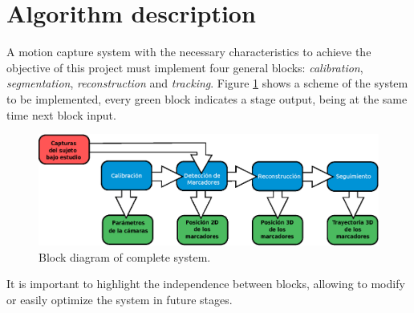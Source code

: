 \section{Algorithm description}\label{implementacion}
A motion capture system with the necessary characteristics to achieve the objective of this project must implement four general blocks: 
\emph{calibration}, \emph{segmentation}, \emph{reconstruction} and \emph{tracking}. Figure \ref{bloquesSist} shows a scheme of the system to be implemented, every green block indicates a stage output, being at the same time next block input.
\begin{figure}[ht!]
\centering
\hspace{-0.5cm}
\includegraphics[scale=0.4]{imagenes/Sistema_completo/Diagrama_de_bloques.eps}
\caption{Block diagram of complete system.}
\label{bloquesSist}
\end{figure}

It is important to highlight the independence between blocks, allowing to modify or easily optimize the system in future stages.
